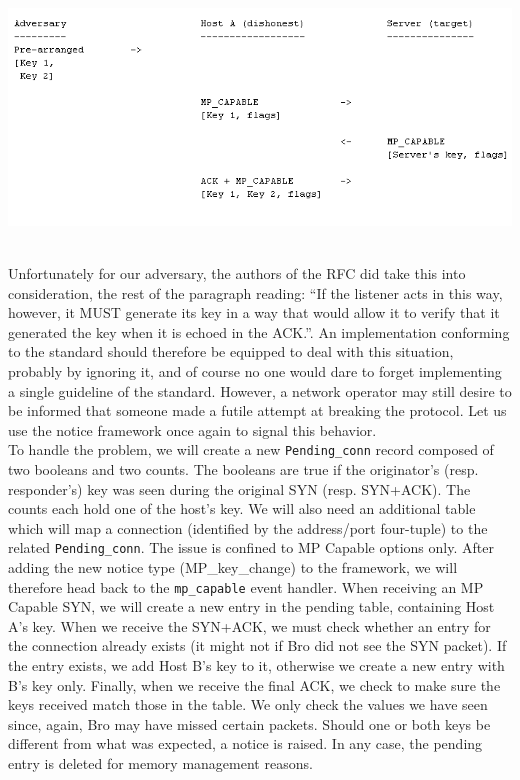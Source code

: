 \begin{minipage}[c]{\textwidth}
\centering
\includegraphics[scale = 0.6]{Figures/mpcapattack.png}
\label{pic:2 cap attack}
\end{minipage} \\ 
%

Unfortunately for our adversary, the authors of the RFC did take this into consideration, the rest of the paragraph reading: ``If the listener acts in this way, however, it MUST generate its key in a way that would allow it to verify that it generated the key when it is echoed in the ACK.''. An implementation conforming to the standard should therefore be equipped to deal with this situation, probably by ignoring it, and of course no one would dare to forget implementing a single guideline of the standard. However, a network operator may still desire to be informed that someone made a futile attempt at breaking the protocol. Let us use the notice framework once again to signal this behavior.\\

To handle the problem, we will create a new \texttt{Pending\_conn} record composed of two booleans and two counts. The booleans are true if the originator's (resp. responder's) key was seen during the original SYN (resp. SYN+ACK). The counts each hold one of the host's key. We will also need an additional table which will map a connection (identified by the address/port four-tuple) to the related \texttt{Pending\_conn}. The issue is confined to MP Capable options only. After adding the new notice type (MP\_key\_change) to the framework, we will therefore head back to the \texttt{mp\_capable} event handler. When receiving an MP Capable SYN, we will create a new entry in the pending table, containing Host A's key. When we receive the SYN+ACK, we must check whether an entry for the connection already exists (it might not if Bro did not see the SYN packet). If the entry exists, we add Host B's key to it, otherwise we create a new entry with B's key only. Finally, when we receive the final ACK, we check to make sure the keys received match those in the table. We only check the values we have seen since, again, Bro may have missed certain packets. Should one or both keys be different from what was expected, a notice is raised. In any case, the pending entry is deleted for memory management reasons. \\

